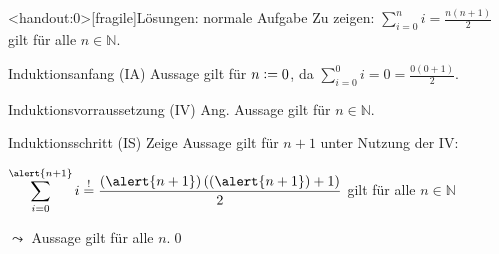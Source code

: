 {\begin{frame}<handout:0>[fragile]{Lösungen: normale Aufgabe}
    Zu zeigen: $\displaystyle\sum_{i=0}^{n} i = \frac{n(n+1)}{2}$ gilt für alle $n \in \mathbb{N}$.
    \begin{alertblock}{Induktionsanfang (IA)}
        Aussage gilt für $n\vcentcolon= 0$, da $\displaystyle\sum_{i=0}^{0} i = 0 = \frac{0(0+1)}{2}$.
    \end{alertblock}
    \begin{alertblock}{Induktionsvorraussetzung (IV)}
        Ang. Aussage gilt für $n \in\mathbb{N}$.
    \end{alertblock}
    \begin{alertblock}{Induktionsschritt (IS)}
        Zeige Aussage gilt für $n+1$ unter Nutzung der IV:\par
        $\displaystyle\sum_{i=0}^{\alert{n+1}} i \overset{!}{=} \frac{(\alert{n+1})\left((\alert{n+1})+1\right)}{2}$ gilt für alle $n \in \mathbb{N}$
    \end{alertblock}
    \alert{$\leadsto$ Aussage gilt für alle $n$.}\qed
\end{frame}
}


